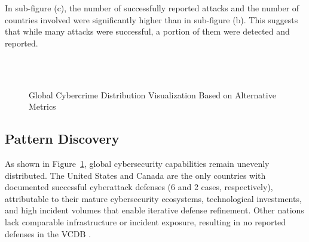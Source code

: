	In sub-figure (c), the number of successfully reported attacks and the number of countries involved were significantly higher than in sub-figure (b).
	This suggests that while many attacks were successful, a portion of them were detected and reported.
	\begin{figure}[htb]
		\centering
		\\
		\hfill
		\\
		\caption{Global Cybercrime Distribution Visualization Based on Alternative Metrics}\label{fig:other-cybercrime-incidents}
	\end{figure}
\subsection{Pattern Discovery}\label{subsec:pattern-discovery} %
	As shown in Figure~\ref{fig:other-cybercrime-incidents}, global cybersecurity capabilities remain unevenly distributed.
	The United States and Canada are the only countries with documented successful cyberattack defenses (6 and 2 cases, respectively),
	attributable to their mature cybersecurity ecosystems, technological investments, and high incident volumes that enable iterative defense refinement.
	Other nations lack comparable infrastructure or incident exposure, resulting in no reported defenses in the VCDB .

